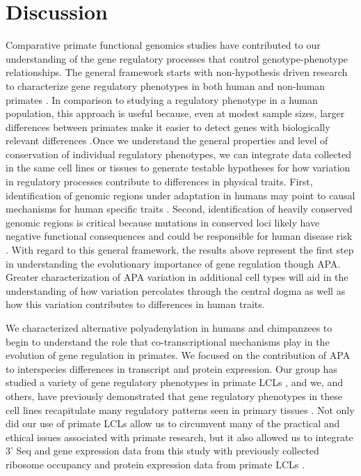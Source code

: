 \section{Discussion}


Comparative primate functional genomics studies have contributed to our understanding of the gene regulatory processes that control genotype-phenotype relationships. The general framework starts with non-hypothesis driven research to characterize gene regulatory phenotypes in both human and non-human primates \citep{blekhman_sex-specific_2010,fair_gene_2020}. In comparison to studying a regulatory phenotype in a human population, this approach is useful because, even at modest sample sizes, larger differences between primates make it easier to detect genes with biologically relevant differences \citep{housman_prime_2020}.Once we understand the general properties and level of conservation of individual regulatory phenotypes, we can integrate data collected in the same cell lines or tissues to generate testable hypotheses for how variation in regulatory processes contribute to differences in physical traits. First, identification of genomic regions under adaptation in humans may point to causal mechanisms for human specific traits \citep{gokhman_differential_2020, ward_generally_2019}. Second, identification of heavily conserved genomic regions is critical because mutations in conserved loci likely have negative functional consequences and could be responsible for human disease risk \citep{housman_assessment_2019}. With regard to this general framework, the results above represent the first step in understanding the evolutionary importance of gene regulation though APA. Greater characterization of APA variation in additional cell types will aid in the understanding of how variation percolates through the central dogma as well as how this variation contributes to differences in human traits.  

We characterized alternative polyadenylation in humans and chimpanzees to begin to understand the role that co-transcriptional mechanisms play in the evolution of gene regulation in primates. We focused on the contribution of APA to interspecies differences in transcript and protein expression. Our group has studied a variety of gene regulatory phenotypes in primate LCLs \citep{cain_gene_2011, khan_primate_2013, wang_post-translational_2018, zhou_epigenetic_2014}, and we, and others, have previously demonstrated that gene regulatory phenotypes in these cell lines recapitulate many regulatory patterns seen in primary tissues \citep{caliskan_effect_2014,caliskan_effects_2011,khaitovich_evolution_2006}. Not only did our use of primate LCLs allow us to circumvent many of the practical and ethical issues associated with primate research, but it also allowed us to integrate 3' Seq and gene expression data from this study with previously collected ribosome occupancy and protein expression data from primate LCLs \citep{khan_primate_2013, wang_post-translational_2018}.


